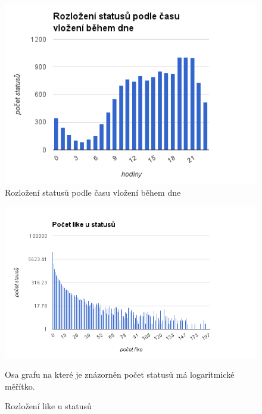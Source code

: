 \documentclass[thesis=M,czech]{FITthesis}[2013/05/10]
\begin{document}
\begin{figure}[h]
\includegraphics[width=5in]{figures/postedHours.png}
\caption{Rozložení statusů podle času vložení během dne}
\label{fig:postedHours}
\end{figure}

\begin{figure}[h]
\includegraphics[width=5in]{figures/postedLikes.png}
\caption{Rozložení like u statusů}
Osa grafu na které je znázorněn počet statusů má logaritmické měřítko.
\label{fig:postedLikes}
\end{figure}
\end{document}
